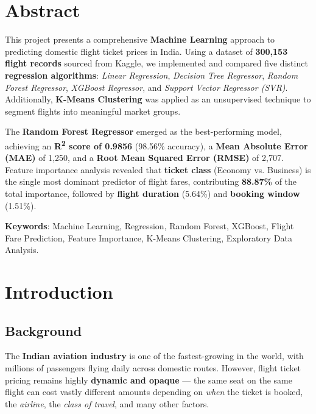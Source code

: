 \documentclass[12pt, a4paper]{article}
\newcommand{\rupee}{\text{₹}}
\begin{document}
\section*{Abstract}

This project presents a comprehensive \textbf{Machine Learning} approach to predicting domestic flight ticket prices in India. Using a dataset of \textbf{300,153 flight records} sourced from Kaggle, we implemented and compared five distinct \textbf{regression algorithms}: \textit{Linear Regression}, \textit{Decision Tree Regressor}, \textit{Random Forest Regressor}, \textit{XGBoost Regressor}, and \textit{Support Vector Regressor (SVR)}. Additionally, \textbf{K-Means Clustering} was applied as an unsupervised technique to segment flights into meaningful market groups.

The \textbf{Random Forest Regressor} emerged as the best-performing model, achieving an \textbf{R\textsuperscript{2} score of 0.9856} (98.56\% accuracy), a \textbf{Mean Absolute Error (MAE)} of \rupee1,250, and a \textbf{Root Mean Squared Error (RMSE)} of \rupee2,707. Feature importance analysis revealed that \textbf{ticket class} (Economy vs. Business) is the single most dominant predictor of flight fares, contributing \textbf{88.87\%} of the total importance, followed by \textbf{flight duration} (5.64\%) and \textbf{booking window} (1.51\%).

\textbf{Keywords}: Machine Learning, Regression, Random Forest, XGBoost, Flight Fare Prediction, Feature Importance, K-Means Clustering, Exploratory Data Analysis.

\newpage

\section{Introduction}

\subsection{Background}

The \textbf{Indian aviation industry} is one of the fastest-growing in the world, with millions of passengers flying daily across domestic routes. However, flight ticket pricing remains highly \textbf{dynamic and opaque} — the same seat on the same flight can cost vastly different amounts depending on \textit{when} the ticket is booked, the \textit{airline}, the \textit{class of travel}, and many other factors.
\end{document}

